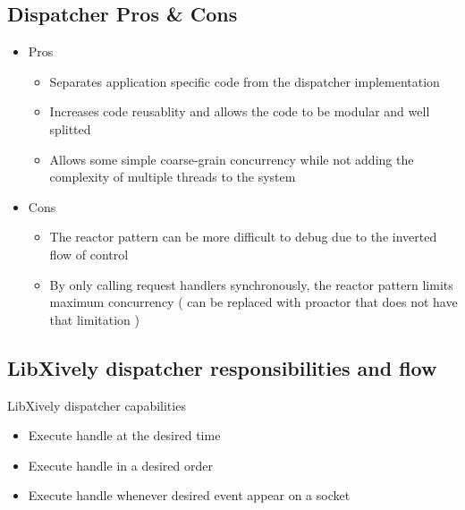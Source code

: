 \documentclass{beamer}
\begin{document}
\subsection{ Dispatcher Pros \& Cons }
\begin{frame}
   \begin{itemize}[<+->]
      \item Pros
      \begin{itemize}
         \item Separates application specific code from the dispatcher implementation
         \item Increases code reusablity and allows the code to be modular and well splitted 
         \item Allows some simple coarse-grain concurrency while not adding the complexity of multiple threads to the system  
      \end{itemize}
      \item Cons
      \begin{itemize}
         \item The reactor pattern can be more difficult to debug due to the inverted flow of control
         \item By only calling request handlers synchronously, the reactor pattern limits maximum concurrency ( can be replaced with proactor that does not have that limitation )
      \end{itemize}
   \end{itemize}
\end{frame}

\subsection{ LibXively dispatcher responsibilities and flow }
\begin{frame}{ LibXively dispatcher capabilities }
   \begin{itemize}[<+->]
      \item Execute handle at the desired time
      \item Execute handle in a desired order
      \item Execute handle whenever desired event appear on a socket
   \end{itemize}
\end{frame}
\end{document}

